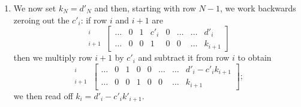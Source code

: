 \begin{enumerate}
\[\begin{array}{ccccccccccc}
	1 & c'_{0} \\
	 & 1 & c'_{1} \\
	&  & 1 & c'_{2}\\
	& &  & \ddots & \ddots \\
	& & &  & 1 & c'_{i} \\
	& & & &  & \ddots & \ddots \\
	& & & & &  & 1 & c'_{N-1} \\
	& & & & & &  & 1 
\end{array}\right]
\left[\begin{array}{c}
	k_{0}\\
	k_{1}\\
	k_{2}\\
	\vdots\\
	k_{i}\\
	\vdots\\
	k_{N-1}\\
	k_{N}
\end{array}\right] = 
\left[\begin{array}{c}
	d'_{0}\\
	d'_{1}\\
	d'_{2}\\
	\vdots\\
	d'_{i}\\
	\vdots\\
	d'_{N-1}\\
	d'_{N}
\end{array}\right].
\]

\item We now set $k_{N}=d'_{N}$ and then, starting with row $N-1$, we work backwards zeroing out the $c'_{i}$: if row $i$ and $i+1$ are
\[
\begin{array}{r} {}^{i}\\ {}^{i+1}\end{array}\,
\left[\begin{array}{ccccccc|c}
	 \ldots & 0 & 1 & c'_{i} & 0 & \ldots & \ldots & d'_{i}\\
	 \ldots & 0 & 0 & 1      & 0 & 0      & \ldots & k_{i+1}
\end{array}\right]
\]
then we multiply row $i+1$ by $c'_{i}$ and subtract it from row $i$ to obtain
\[
\begin{array}{r} {}^{i}\\ {}^{i+1}\end{array}\,
\left[\begin{array}{ccccccc|c}
	 \ldots & 0 & 1 & 0 & 0 & \ldots & \ldots & d'_{i}-c'_{i}k_{i+1}\\
	 \ldots & 0 & 0 & 1 & 0 & 0      & \ldots & k_{i+1}
\end{array}\right];
\]
we then read off $k_{i} = d'_{i}-c'_{i}k'_{i+1}$.
\end{enumerate}
